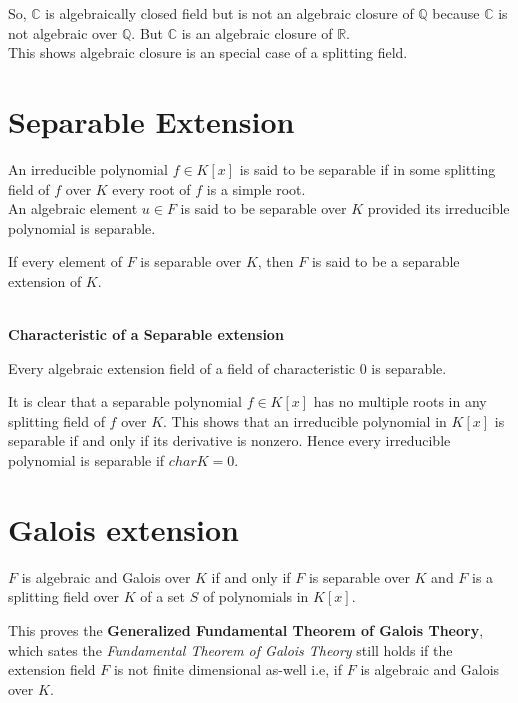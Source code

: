 So, \(\mathbb{C}\) is algebraically closed field but is not an algebraic closure of \(\mathbb{Q}\) because \(\mathbb{C}\) is not algebraic over \(\mathbb{Q}\).
But \(\mathbb{C}\) is an algebraic closure of \(\mathbb{R}\).\\
This shows algebraic closure is an special case of a splitting field.

\section{Separable Extension}
An irreducible polynomial \(f \in K[x]\) is said to be separable if in some splitting field of \(f\) over \(K\) every root of \(f\) is a simple root.\\
An algebraic element \(u \in F\) is said to be separable over \(K\) provided its irreducible polynomial is separable.
\begin{definition}
  If every element of \(F\) is separable over \(K\), then \(F\) is said to be a separable extension of \(K\).\\ \\
\end{definition}
\textbf{Characteristic of a Separable extension}
\begin{remark}
  Every algebraic extension field of a field of characteristic \(0\) is separable.
  \end{remark}

It is clear that a separable polynomial \(f \in K[x]\) has no multiple roots in any splitting field of \(f\) over \(K\). This shows that an irreducible polynomial in \(K[x]\) is separable if and only if its derivative is nonzero. Hence every irreducible polynomial is separable if \(char K = 0\).


\section{Galois extension}
\begin{theorem}
  \(F\) is algebraic and Galois over \(K\) if and only if \(F\) is separable over \(K\) and \(F\) is a splitting field over \(K\) of a set \(S\) of polynomials in \(K[x]\).\\
  \end{theorem}

This proves the \textbf{Generalized Fundamental Theorem of Galois Theory},\\
which sates the \textit{Fundamental Theorem of Galois Theory} still holds if the extension field \(F\) is not finite dimensional as-well i.e, if \(F\) is algebraic and Galois over \(K\).
